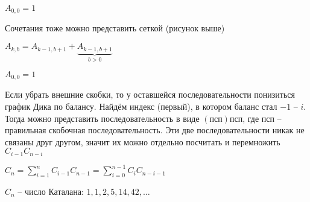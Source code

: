 \documentclass{book}
\theoremstyle{definition}
\begin{document}
$A_{0,0} = 1$


Сочетания тоже можно представить сеткой (рисунок выше)

$A_{k,b} = A_{k-1,b+1} + \underbrace{A_{k-1, b+1}}\limits_{b>0}$

$A_{0,0} = 1$

Если убрать внешние скобки, то у оставшейся последовательности понизиться график Дика по балансу. Найдём индекс (первый), в котором баланс стал $-1$  --  $i$. Тогда можно представить последовательность в виде $(\text{псп})\text{псп}$, где псп -- правильная скобочная последовательность. Эти две последовательности никак не связаны друг другом, значит их можно отдельно посчитать и перемножить $C_{i-1}C_{n-i}$

$C_n = \sum_{i=1}^{n} C_{i-1}C_{n-1} = \sum_{i=0}^{n-1} C_iC_{n-i-1}$

$C_n$ -- число Каталана:  $1, 1, 2, 5, 14, 42, \ldots$
\end{document}
